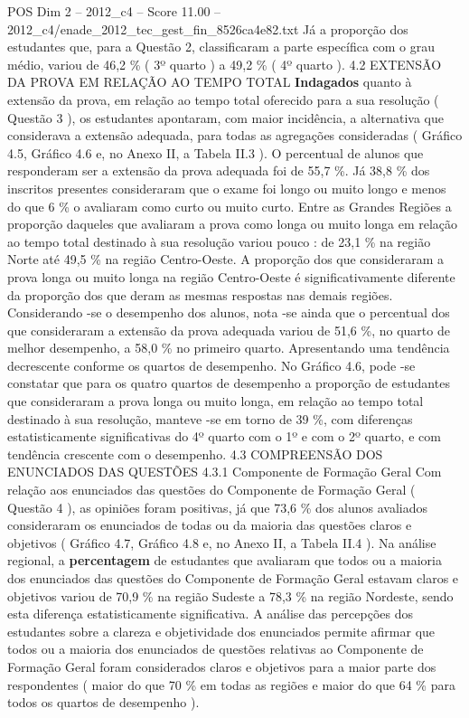 \begin{textsample}{POS Dim 2 – 2012\_c4 – Score 11.00 – 2012\_c4/enade\_2012\_tec\_gest\_fin\_8526ca4e82.txt}
Já a proporção dos estudantes que, para a Questão 2, classificaram a parte específica com o grau médio, variou de 46,2 \% ( 3º quarto ) a 49,2 \% ( 4º quarto ). 4.2 EXTENSÃO DA PROVA EM RELAÇÃO AO TEMPO TOTAL \textbf{Indagados} quanto à extensão da prova, em relação ao tempo total oferecido para a sua resolução ( Questão 3 ), os estudantes apontaram, com maior incidência, a alternativa que considerava a extensão adequada, para todas as agregações consideradas ( Gráfico 4.5, Gráfico 4.6 e, no Anexo II, a Tabela II.3 ).
O percentual de alunos que responderam ser a extensão da prova adequada foi de 55,7 \%.
Já 38,8 \% dos inscritos presentes consideraram que o exame foi longo ou muito longo e menos do que 6 \% o avaliaram como curto ou muito curto.
Entre as Grandes Regiões a proporção daqueles que avaliaram a prova como longa ou muito longa em relação ao tempo total destinado à sua resolução variou pouco : de 23,1 \% na região Norte até 49,5 \% na região Centro-Oeste.
A proporção dos que consideraram a prova longa ou muito longa na região Centro-Oeste é significativamente diferente da proporção dos que deram as mesmas respostas nas demais regiões.
Considerando -se o desempenho dos alunos, nota -se ainda que o percentual dos que consideraram a extensão da prova adequada variou de 51,6 \%, no quarto de melhor desempenho, a 58,0 \% no primeiro quarto.
Apresentando uma tendência decrescente conforme os quartos de desempenho.
No Gráfico 4.6, pode -se constatar que para os quatro quartos de desempenho a proporção de estudantes que consideraram a prova longa ou muito longa, em relação ao tempo total destinado à sua resolução, manteve -se em torno de 39 \%, com diferenças estatisticamente significativas do 4º quarto com o 1º e com o 2º quarto, e com tendência crescente com o desempenho. 4.3 COMPREENSÃO DOS ENUNCIADOS DAS QUESTÕES 4.3.1 Componente de Formação Geral Com relação aos enunciados das questões do Componente de Formação Geral ( Questão 4 ), as opiniões foram positivas, já que 73,6 \% dos alunos avaliados consideraram os enunciados de todas ou da maioria das questões claros e objetivos ( Gráfico 4.7, Gráfico 4.8 e, no Anexo II, a Tabela II.4 ).
Na análise regional, a \textbf{percentagem} de estudantes que avaliaram que todos ou a maioria dos enunciados das questões do Componente de Formação Geral estavam claros e objetivos variou de 70,9 \% na região Sudeste a 78,3 \% na região Nordeste, sendo esta diferença estatisticamente significativa.
A análise das percepções dos estudantes sobre a clareza e objetividade dos enunciados permite afirmar que todos ou a maioria dos enunciados de questões relativas ao Componente de Formação Geral foram considerados claros e objetivos para a maior parte dos respondentes ( maior do que 70 \% em todas as regiões e maior do que 64 \% para todos os quartos de desempenho ).

\end{textsample}

